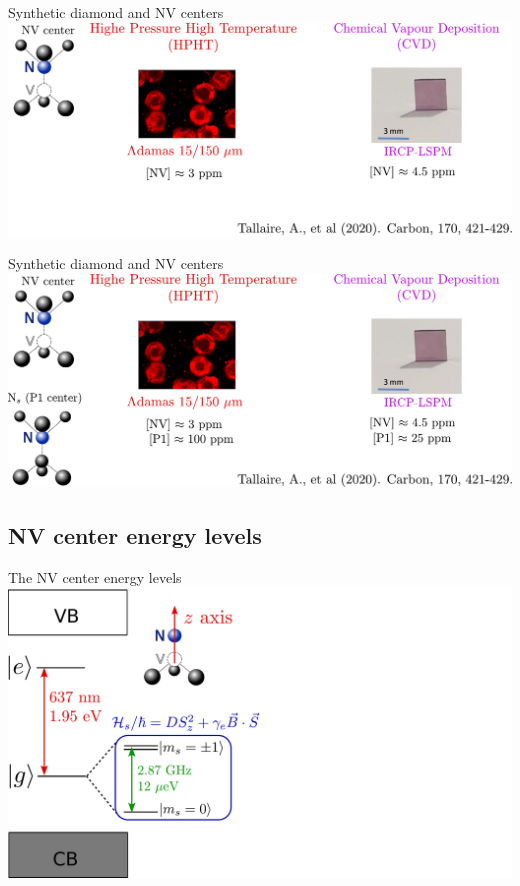 \documentclass{beamer}
\begin{document}
\begin{frame}{Synthetic diamond and NV centers}
\centering
\includegraphics[width=\textwidth,height=0.85\textheight,keepaspectratio]{Slide_fab_sample-1}
\end{frame}

\begin{frame}{Synthetic diamond and NV centers}
\centering
\includegraphics[width=\textwidth,height=0.85\textheight,keepaspectratio]{Slide_fab_sample}
\end{frame}

\subsection{NV center energy levels}
\begin{frame}{The NV center energy levels}
\centering
\includegraphics[width=\textwidth,height=0.85\textheight,keepaspectratio]{Slide_NV_levels_3}
\end{frame}
\end{document}
